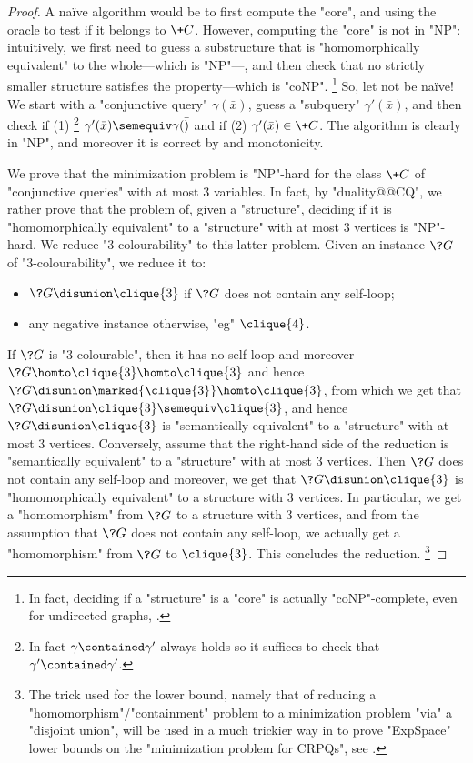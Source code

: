 \begin{proof}
	A naïve algorithm would be to first compute the "core", and using the oracle
	to test if it belongs to $\+C$.
	However, computing the "core" is not in "NP": intuitively,
	we first need to guess a substructure that is "homomorphically equivalent"
	to the whole---which is "NP"---,
	and then check that no strictly smaller structure satisfies the property---which is "coNP".%
	\footnote{In fact, deciding if a "structure" is a "core" is actually
	"coNP"-complete, even for undirected graphs, \cite[Theorem~7]{HellNesetril1992Core}.}
	So, let not be naïve! We start with a "conjunctive query"
	$\gamma(\bar x)$, guess a "subquery" $\gamma'(\bar x)$,
	and then check if (1)%
	\footnote{In fact $\gamma \contained \gamma'$ always holds so
	it suffices to check that $\gamma' \contained \gamma'$.}
	$\gamma'(\bar x) \semequiv \gamma(\bar)$ and
	if (2) $\gamma'(\bar x) \in \+C$.
	The algorithm is clearly in "NP", and moreover it is correct
	by  and monotonicity.

	 We prove that the minimization problem
	is "NP"-hard for the class $\+C$ of "conjunctive queries" with
	at most $3$ variables.
	In fact, by "duality@@CQ", we rather prove that the problem
	of, given a "structure", deciding if it is "homomorphically equivalent"
	to a "structure" with at most $3$ vertices is "NP"-hard.
	We reduce "$3$-colourability" to this latter problem.
	Given an instance $\?G$ of "$3$-colourability", we reduce
	it to:
	\begin{itemize}
		\item $\?G \disunion \clique{3}$ if $\?G$ does not contain any self-loop;
		\item any negative instance otherwise, "eg" $\clique{4}$.
	\end{itemize}
	If $\?G$ is "$3$-colourable", then it has no self-loop
	and moreover $\?G \homto \clique{3} \homto \clique{3}$
	and hence $\?G \disunion \marked{\clique{3}} \homto \clique{3}$, 
	from which we get that $\?G \disunion \clique{3} \semequiv \clique{3}$,
	and hence $\?G \disunion \clique{3}$ is "semantically equivalent" to a "structure"
	with at most $3$ vertices.
	Conversely, assume that the right-hand side of the reduction is "semantically equivalent" to a 
	"structure" with at most $3$ vertices. Then $\?G$ does not contain any self-loop
	and moreover, we get that $\?G \disunion \clique{3}$ is "homomorphically equivalent"
	to a structure with 3 vertices.
	In particular, we get a "homomorphism" from $\?G$ to a structure with 3 vertices,
	and from the assumption that $\?G$ does not contain any self-loop,
	we actually get a "homomorphism" from $\?G$ to $\clique{3}$.
	This concludes the reduction.%
	\footnote{The trick used for the lower bound, 
	namely that of reducing a "homomorphism"/"containment" problem
	to a minimization problem "via" a "disjoint union", will be used in a
	much trickier way in 
	to prove "ExpSpace" lower bounds on the "minimization problem for CRPQs", 
	see \label{sec:minimization-lowerbounds,apdx-sec:lowerbound-variables}.}
\end{proof}

